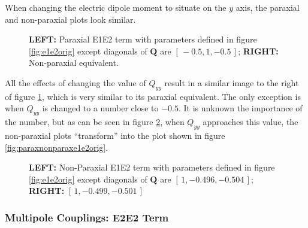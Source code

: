 \documentclass{article}
\newcommand{\brackets}[1]{\left[\,#1\,\right]}
\begin{document}
\begin{onehalfspace}
	When changing the electric dipole moment to situate on the \(y\) axis, the paraxial and non-paraxial plots look similar.

	\begin{figure}[H]
		\centering
		\begin{minipage}{0.5\textwidth}
			
		\end{minipage}\begin{minipage}{0.5\textwidth}
			
		\end{minipage}
		\caption{\textbf{L{\scriptsize EFT:}} Paraxial E1E2 term with parameters defined in figure \ref{fig:e1e2orig} except diagonals of \(\symbf{Q}\) are \(\brackets{-0.5,1,-0.5}\); \textbf{R{\scriptsize IGHT:}} Non-paraxial equivalent.}
		\label{fig:paraxnonparaxe1e2q1}
	\end{figure}

	All the effects of changing the value of \(Q_{yy}\) result in a similar image to the right of figure \ref{fig:paraxnonparaxe1e2q1}, which is very similar to its paraxial equivalent. The only exception is when \(Q_{yy}\) is changed to a number close to \(-0.5\). It is unknown the importance of the number, but as can be seen in figure \ref{fig:paraxnonparaxe1e2q2}, when \(Q_{yy}\) approaches this value, the non-paraxial plots ``transform'' into the plot shown in figure \ref{fig:paraxnonparaxe1e2orig}.

	\begin{figure}[H]
		\centering
		\begin{minipage}{0.5\textwidth}
			
		\end{minipage}\begin{minipage}{0.5\textwidth}
			
		\end{minipage}
		\caption{\textbf{L{\scriptsize EFT:}} Non-Paraxial E1E2 term with parameters defined in figure \ref{fig:e1e2orig} except diagonals of \(\symbf{Q}\) are \(\brackets{1,-0.496,-0.504}\); \textbf{R{\scriptsize IGHT:}} \(\brackets{1,-0.499,-0.501}\)}
		\label{fig:paraxnonparaxe1e2q2}
	\end{figure}

	\subsubsection{Multipole Couplings: E2E2 Term}\label{ssec:nonparaxe2}


\end{onehalfspace}
\end{document}

